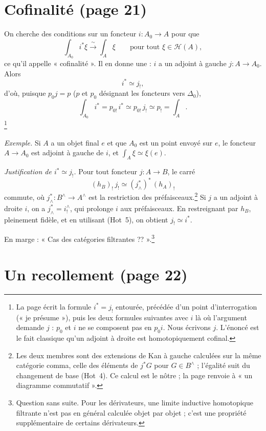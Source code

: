 \documentclass[11pt,a4paper]{article}
\begin{document}
\section*{Cofinalité (page 21)}

On cherche des conditions sur un foncteur $i : A_0 \to A$ pour que
\[
  \int_{A_0} i^{*}\xi \xrightarrow{\ \sim\ } \int_A \xi \qquad \text{pour tout
  } \xi \in \mathcal H(A),
\]
ce qu'il appelle « cofinalité ». Il en donne une : $i$ a un adjoint à gauche
$j : A \to A_0$. Alors
\[
  i^{*} \simeq j_{!},
\]
d'où, puisque $p_0 j = p$ ($p$ et $p_0$ désignant les foncteurs vers
$\Delta_0$),
\[
  \int_{A_0} i^{*} = p_{0!}\, i^{*} \simeq p_{0!}\, j_{!} \simeq p_{!} =
  \int_A.
\]
\footnote{La page écrit la formule $i^{*} = j_{!}$ entourée, précédée d'un
point d'interrogation (« je présume »), puis les deux formules suivantes avec
$i$ là où l'argument demande $j$ : $p_0$ et $i$ ne se composent pas en
$p_0 i$. Nous écrivons $j$. L'énoncé est le fait classique qu'un adjoint à
droite est homotopiquement cofinal.}

\emph{Exemple.} Si $A$ a un objet final $e$ et que $A_0$ est un point envoyé
sur $e$, le foncteur $A \to A_0$ est adjoint à gauche de $i$, et $\int_A \xi
\simeq \xi(e)$.

\emph{Justification de $i^{*} \simeq j_{!}$.} Pour tout foncteur $j : A \to
B$, le carré
\[
  (h_B)_{!}\, j_{!} \simeq (j^{*}_{\wedge})^{*}\, (h_A)_{!}
\]
commute, où $j^{*}_{\wedge} : B^{\wedge} \to A^{\wedge}$ est la restriction des
préfaisceaux.\footnote{Les deux membres sont des extensions de Kan à gauche
calculées sur la même catégorie comma, celle des éléments de $j^{*}G$ pour
$G \in B^{\wedge}$ ; l'égalité suit du changement de base (Hot~4). Ce calcul
est le nôtre ; la page renvoie à « un diagramme commutatif ».} Si $j$ a un
adjoint à droite $i$, on a $j^{*}_{\wedge} = i^{\wedge}_{!}$, qui prolonge
$i$ aux préfaisceaux. En restreignant par $h_B$, pleinement fidèle, et en
utilisant (Hot~5), on obtient $j_{!} \simeq i^{*}$.

En marge : « Cas des catégories filtrantes ?? ».\footnote{Question sans
suite. Pour les dérivateurs, une limite inductive homotopique filtrante n'est
pas en général calculée objet par objet ; c'est une propriété
supplémentaire de certains dérivateurs.}

\section*{Un recollement (page 22)}
\end{document}
